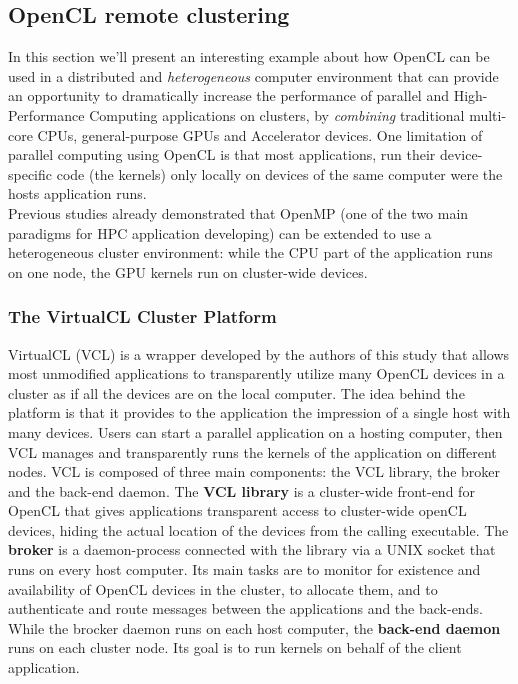 \subsection{OpenCL remote clustering}
In this section we'll present an interesting example \cite{mosix:virtualcl} about how OpenCL can be used in a distributed and \emph{heterogeneous} computer environment that can provide an opportunity to dramatically increase the performance of parallel and High-Performance Computing applications on clusters, by \emph{combining} traditional multi-core CPUs, general-purpose GPUs and Accelerator devices. One limitation of parallel computing using OpenCL is that most applications, run their device-specific code (the kernels) only locally on devices of the same computer were the hosts application runs.\\
Previous studies already demonstrated \cite{barak:heterogeneous} that OpenMP (one of the two main paradigms for HPC application developing) can be extended to use a heterogeneous cluster environment: while the CPU part of the application runs on one node, the GPU kernels run on cluster-wide devices.

\subsubsection{The VirtualCL Cluster Platform}
VirtualCL (VCL) is a wrapper developed by the authors of this study that allows most unmodified applications
to transparently utilize many OpenCL devices in a cluster as if all the devices are on the local computer.
The idea behind the platform is that it provides to the application the impression of a single host with many devices. Users can start a parallel application on a hosting computer, then VCL manages and transparently runs
the kernels of the application on different nodes.
VCL is composed of three main components: the VCL library, the broker and the back-end daemon.
The \textbf{VCL library} is a cluster-wide front-end for OpenCL that gives applications transparent access to cluster-wide openCL devices, hiding the actual location of the devices from the calling executable.
The \textbf{broker} is a daemon-process connected with the library via a UNIX socket that runs on every host computer. Its main tasks are to monitor for existence and availability of OpenCL devices in the cluster, to allocate them, and to authenticate and route messages between the applications and the back-ends.
While the brocker daemon runs on each host computer, the \textbf{back-end daemon} runs on each cluster node. Its goal is to run kernels on behalf of the client application.

